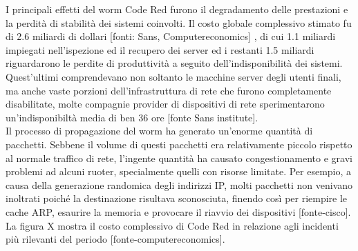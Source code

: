 I principali effetti del worm Code Red furono il degradamento delle prestazioni e la perdità di stabilità dei sistemi coinvolti. Il costo globale complessivo stimato fu di 2.6 miliardi di dollari [fonti: Sans, Computereconomics] , di cui 1.1 miliardi impiegati nell’ispezione ed il recupero dei server ed i restanti 1.5 miliardi riguardarono le perdite di produttività a seguito dell’indisponibilità dei sistemi.\\
Quest’ultimi comprendevano non soltanto le macchine server degli utenti finali, ma anche vaste porzioni dell’infrastruttura di rete che furono completamente disabilitate, molte compagnie provider di dispositivi di rete sperimentarono un’indisponibiltà media di ben 36 ore [fonte Sans institute].\\
Il processo di propagazione del worm ha generato un’enorme quantità di pacchetti. Sebbene il volume di questi pacchetti era relativamente piccolo rispetto al normale traffico di rete, l’ingente quantità ha causato congestionamento e gravi problemi ad alcuni ruoter, specialmente quelli con risorse limitate. Per esempio, a causa della generazione randomica degli indirizzi IP, molti pacchetti non venivano inoltrati poiché la destinazione risultava sconosciuta, finendo così per riempire le cache ARP, esaurire la memoria e provocare il riavvio dei dispositivi [fonte-cisco].\\
La figura X mostra il costo complessivo di Code Red in relazione agli incidenti più rilevanti del periodo [fonte-computereconomics].

